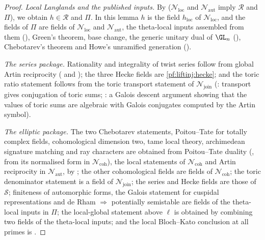 \begin{proof}
\emph{Local Langlands and the published inputs.} By 
($\mathcal N_{\mathrm{loc}}$ and $\mathcal N_{\mathrm{aut}}$ imply $\mathcal R$ and $\Pi$), we obtain $h\in\mathcal R$ and $\Pi$. In this lemma $h$ is the field
$h_{\mathrm{loc}}$ of $\mathcal N_{\mathrm{loc}}$, and the fields of $\Pi$ are fields of $\mathcal N_{\mathrm{loc}}$ and $\mathcal N_{\mathrm{aut}}$, the
theta-local inputs assembled from them (), Green's theorem, base change, the generic unitary
dual of $\GL_n$ (), Chebotarev's theorem and Howe's unramified generation
().

\emph{The series package.} Rationality and integrality of twist series follow from global Artin reciprocity
( and ); the three Hecke fields are
\cref{pf:liftinj:hecke}; and the toric ratio statement follows from the toric transport statement of $\mathcal N_{\mathrm{join}}$
(: transport gives conjugation of toric sums;
: a Galois descent argument showing that the values of toric sums are
algebraic with Galois conjugates computed by the Artin symbol).

\emph{The elliptic package.} The two Chebotarev statements, Poitou--Tate for totally complex fields, cohomological dimension two, tame local theory,
archimedean signature matching and ray characters are obtained from Poitou--Tate duality (,
from its normalised form in $\mathcal N_{\mathrm{coh}}$), the local statements of $\mathcal N_{\mathrm{coh}}$ and Artin reciprocity in
$\mathcal N_{\mathrm{aut}}$, by ; the other cohomological fields are fields of $\mathcal N_{\mathrm{coh}}$; the
toric denominator statement is a field of $\mathcal N_{\mathrm{join}}$; the series and Hecke fields are those of $\mathcal S$; finiteness of automorphic forms,
the Galois statement for cuspidal representations and de Rham $\Rightarrow$ potentially semistable are fields of the theta-local inputs in $\Pi$; the
local-global statement above $\ell$ is obtained by combining two fields of the theta-local inputs; and the local Bloch--Kato conclusion at all primes
is .


\end{proof}
